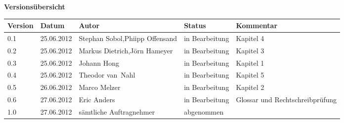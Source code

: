 
{\textbf{Versionsübersicht}}\\[2ex]

\begin{longtable}{|m{1.78cm}|m{1.59cm}|m{2.86cm}|m{1.9cm}|m{5.25cm}|}

  \hline                                              %

  \textbf{Version}  &    \textbf{Datum}  &    \textbf{Autor}  &
  \textbf{Status}   &    \textbf{Kommentar}       \\  %
  \hline                                              %


  0.1    &    25.06.2012    &    Stephan Sobol,\newline Phiipp \mbox{Offensand}    &    
  in Bearbeitung    &  Kapitel 4   \\      %
  \hline                                                     %
  0.2    &    25.06.2012    &    Markus Dietrich,\newline Jörn Hameyer    &    
  in Bearbeitung    &    Kapitel 3\\      %
  \hline                            %
  0.3    &    25.06.2012    &    Johann Hong    &    
  in Bearbeitung    &    Kapitel 1\\      %
  \hline                                                     %
  0.4    &    25.06.2012    &    Theodor \mbox{van Nahl}    &    
  in Bearbeitung    &    Kapitel 5\\      %
  \hline                                                     %
  0.5    &    26.06.2012    &    Marco Melzer    &    
  in Bearbeitung    &    Kapitel 2\\      %
  \hline                                                     %
  0.6    &    27.06.2012    &    Eric Anders    &    
  in Bearbeitung    &    Glossar und Rechtschreibprüfung\\      %
  \hline                                                     %
  1.0    &    27.06.2012    &    sämtliche Auftragnehmer    &    
  abgenommen    &    \\      %
  \hline                                                     %
  
  

\end{longtable}
